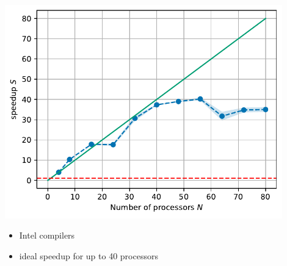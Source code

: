 \documentclass[aspectratio=169]{beamer}
\begin{document}
\begin{frame}
\begin{columns}
		\begin{column}{0.5\textwidth}
				\includegraphics[width=0.9\textwidth]{figs/TaS2_intel_bench_nprocs_speedup.pdf}
			\begin{itemize}
				\item Intel compilers
				\item ideal speedup for up to 40 processors
			\end{itemize}
		\end{column}
	\end{columns}
\end{frame}
\end{document}

